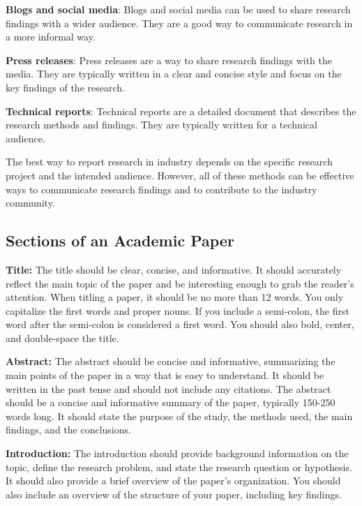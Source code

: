 \documentclass[
  b5paper]{book}
\begin{document}
\textbf{Blogs and social media}: Blogs and social media can be used to share research findings with a wider audience. They are a good way to communicate research in a more informal way.

\textbf{Press releases}: Press releases are a way to share research findings with the media. They are typically written in a clear and concise style and focus on the key findings of the research.

\textbf{Technical reports}: Technical reports are a detailed document that describes the research methods and findings. They are typically written for a technical audience.

The best way to report research in industry depends on the specific research project and the intended audience. However, all of these methods can be effective ways to communicate research findings and to contribute to the industry community.

\hypertarget{sections-of-an-academic-paper}{%
\subsection*{Sections of an Academic Paper}\label{sections-of-an-academic-paper}}

\textbf{Title:} The title should be clear, concise, and informative. It should accurately reflect the main topic of the paper and be interesting enough to grab the reader's attention. When titling a paper, it should be no more than 12 words. You only capitalize the first words and proper nouns. If you include a semi-colon, the first word after the semi-colon is considered a first word. You should also bold, center, and double-space the title.

\textbf{Abstract:} The abstract should be concise and informative, summarizing the main points of the paper in a way that is easy to understand. It should be written in the past tense and should not include any citations. The abstract should be a concise and informative summary of the paper, typically 150-250 words long. It should state the purpose of the study, the methods used, the main findings, and the conclusions.

\textbf{Introduction:} The introduction should provide background information on the topic, define the research problem, and state the research question or hypothesis. It should also provide a brief overview of the paper's organization. You should also include an overview of the structure of your paper, including key findings.
\end{document}
